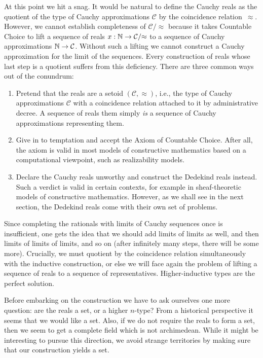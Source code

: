 At this point we hit a snag. It would be natural to define the Cauchy reals as the
quotient of the type of Cauchy approximations $\mathcal{C}$ by the coincidence
relation~$\approx$. However, we cannot establish completeness of $\mathcal{C}/{\approx}$
because it takes Countable Choice to lift a sequence of reals $x : \mathbb{N} \to
\mathcal{C}/{\approx}$ to a sequence of Cauchy approximations $\mathbb{N} \to \mathcal{C}$.
Without such a lifting we cannot construct a Cauchy approximation for the limit of the
sequences. Every construction of reals whose last step is a quotient suffers from this
deficiency. There are three common ways out of the conundrum:
%
\begin{enumerate}
\item Pretend that the reals are a setoid $(\mathcal{C}, {\approx})$, i.e., the type of
  Cauchy approximations $\mathcal{C}$ with a coincidence relation attached to it by
  administrative decree. A sequence of reals them simply \emph{is} a sequence of Cauchy
  approximations representing them.
\item Give in to temptation and accept the Axiom of Countable Choice. After all, the axiom
  is valid in most models of constructive mathematics based on a computational viewpoint,
  such as realizability models.
\item Declare the Cauchy reals unworthy and construct the Dedekind reals instead. Such a
  verdict is valid in certain contexts, for example in sheaf-theoretic models of
  constructive mathematics. However, as we shall see in the next section, the Dedekind
  reals come with their own set of problems.
\end{enumerate}
%
Since completing the rationals with limits of Cauchy sequences once is insufficient, one
gets the idea that we should add limits of limits as well, and then limits of limits of
limits, and so on (after infinitely many steps, there will be some more). Crucially, we
must quotient by the coincidence relation simultaneously with the inductive construction,
or else we will face again the problem of lifting a sequence of reals to a sequence of
representatives. Higher-inductive types are the perfect solution.

Before embarking on the construction we have to ask ourselves one more question: are the
reals a set, or a higher $n$-type? From a historical perspective it seems that we would
like a set. Also, if we do not require the reals to form a set, then we seem to get a
complete field which is not archimedean. While it might be interesting to pursue this
direction, we avoid strange territories by making sure that our construction yields a set.


